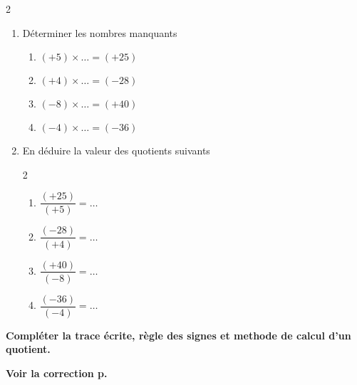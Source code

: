  \label{N1activite004}
\begin{activite} 
    \begin{multicols}2          
        \begin{enumerate}
        \item Déterminer les nombres manquants
            \begin{enumerate}
                \item $(+5)\times \ldots = (+25)$
                \item $(+4)\times \ldots = (-28)$
                \item $(-8)\times \ldots = (+40)$
                \item $(-4)\times \ldots = (-36)$
            \end{enumerate}
        \columnbreak        
        \item En déduire la valeur des quotients suivants            
            \begin{multicols}2
                \begin{enumerate}
                    \item $\dfrac{(+25)}{(+5)} = \ldots$
                    \item $\dfrac{(-28)}{(+4)} = \ldots$
                    \item $\dfrac{(+40)}{(-8)} = \ldots$
                    \item $\dfrac{(-36)}{(-4)} = \ldots$
                \end{enumerate}
            \end{multicols}                    
        \end{enumerate}
    \end{multicols}
    
    \textbf{Compléter la trace écrite, règle des signes et methode de calcul d'un quotient.}

    \textbf{Voir la correction p. \hyperref[corrN1activite004]{\pageref{corrN1activite004}}}

\end{activite}
